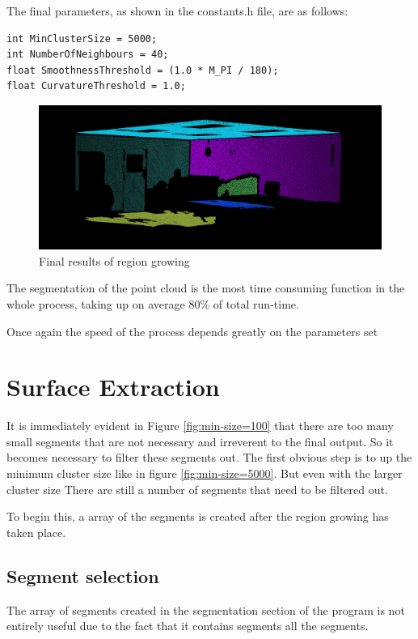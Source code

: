 		The final parameters, as shown in the constants.h file, are as follows:

		\begin{lstlisting}
int MinClusterSize = 5000;
int NumberOfNeighbours = 40;
float SmoothnessThreshold = (1.0 * M_PI / 180);
float CurvatureThreshold = 1.0;
		\end{lstlisting}
			
			\begin{figure}[H]
				\centering
				\includegraphics[width=1\linewidth]{Includes/images/RegionGrowing/Final}
				\caption{Final results of region growing}
				\label{fig:Final}
			\end{figure}
 
	
			The segmentation of the point cloud is the most time consuming function in the whole process, taking up on average 80\% of total run-time.
			
			Once again the speed of the process depends greatly on the parameters set
		
		

	\section{Surface Extraction}
	
	It is immediately evident in Figure \ref{fig:min-size=100} that there are too many small segments that are not necessary and irreverent to the final output. So it becomes necessary to filter these segments out. The first obvious step is to up the minimum cluster size like in figure \ref{fig:min-size=5000}. But even with the larger cluster size There are still a number of segments that need to be filtered out.
	
	To begin this, a array of the segments is created after the region growing has taken place.


	\subsection{Segment selection}
		The array of segments created in the segmentation section of the program is not entirely useful due to the fact that it contains segments all the segments.
		
